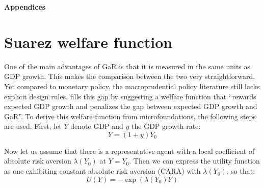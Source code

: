 \documentclass[12pt,a4paper]{article}
\begin{document}
\newpage





\newpage

\begin{flushleft}
    \LARGE\textbf{Appendices}\par
\end{flushleft}

\vspace{1cm}

\appendix

\section{Suarez welfare function}
\label{appx:suarez}
One of the main advantages of GaR is that it is measured in the same units as GDP growth. This makes the comparison between the two very straightforward. Yet compared to monetary policy, the macroprudential policy literature still lacks explicit design rules. \citet{suarez2022} fills this gap by suggesting a welfare function that ``rewards expected GDP growth and penalizes the gap between expected GDP growth and GaR''. To derive this welfare function from microfoundations, the following steps are used.
First, let $Y$ denote GDP and $y$ the GDP growth rate:
\begin{equation}
    \label{eq:gdp_growth_theory}
    Y = (1+y)Y_0
\end{equation}

Now let us assume that there is a representative agent with a local coefficient of absolute risk aversion $\lambda(Y_0)$ at $Y=Y_0$. Then we can express the utility function as one exhibiting constant absolute risk aversion (CARA) with $\lambda(Y_0)$, so that:
\begin{equation}
    \label{eq:utility_theory}
    U(Y) = -\exp{\left(\lambda(Y_0)Y\right)}
\end{equation}
\end{document}
